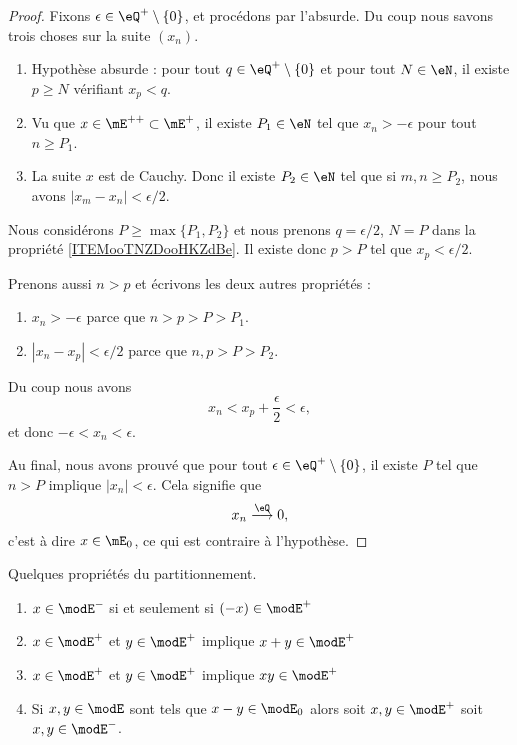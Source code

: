 \begin{proof}
    Fixons \( \epsilon\in \eQ^+\setminus\{ 0 \}\), et procédons par l'absurde. Du coup nous savons trois choses sur la suite \( (x_n)\).
    \begin{enumerate}
        \item       \label{ITEMooTNZDooHKZdBe}
            Hypothèse absurde : pour tout \( q\in \eQ^+\setminus\{ 0 \}\) et pour tout \( N\in \eN\), il existe \( p\geq N\) vérifiant \( x_p<q\).
        \item
            Vu que \( x\in \mE^{++}\subset \mE^+\), il existe \( P_1\in \eN\) tel que \( x_n>-\epsilon\) pour tout \( n\geq P_1\).
        \item
            La suite \( x\) est de Cauchy. Donc il existe \( P_2\in \eN\) tel que si \( m,n\geq P_2\), nous avons \( | x_m-x_n |<\epsilon/2\).
    \end{enumerate}
    Nous considérons \( P\geq \max\{ P_1, P_2 \}\) et nous prenons \( q=\epsilon/2\), \( N=P\) dans la propriété \ref{ITEMooTNZDooHKZdBe}. Il existe donc \( p>P\) tel que \( x_p<\epsilon/2\).

    Prenons aussi \( n>p\) et écrivons les deux autres propriétés :
    \begin{enumerate}
        \item \( x_n>-\epsilon\) parce que \( n>p>P>P_1\).
        \item \( | x_n-x_p |<\epsilon/2\) parce que \( n,p>P>P_2\).
    \end{enumerate}
    Du coup nous avons
    \begin{equation}
        x_n<x_p+\frac{ \epsilon }{2}<\epsilon,
    \end{equation}
    et donc \( -\epsilon<x_n<\epsilon\).

    Au final, nous avons prouvé que pour tout \( \epsilon\in \eQ^+\setminus\{ 0 \}\), il existe \( P\) tel que \( n>P\) implique \( | x_n |<\epsilon\). Cela signifie que
    \begin{equation}
        x_n\stackrel{\eQ}{\longrightarrow}0,
    \end{equation}
    c'est à dire \( x\in \mE_0\), ce qui est contraire à l'hypothèse.
\end{proof}


\begin{lemma}      \label{LEMooRKSXooFsIohe}
    Quelques propriétés du partitionnement.
    \begin{enumerate}
        \item       \label{ITEMooRQVKooCnwWOY}
            \( x\in\modE^-\) si et seulement si \( (-x)\in\modE^+\)
        \item       \label{ITEMooJUPOooOBubqA}
            \( x\in\modE^+\) et \( y\in\modE^+\) implique \( x+y\in\modE^+\)
        \item       \label{ITEMooDQLJooPViuVC}
            \( x\in\modE^+\) et \( y\in\modE^+\) implique \( xy\in\modE^+\)
        \item
            Si \( x,y\in\modE\) sont tels que \( x-y\in\modE_0\) alors soit \( x,y\in\modE^+\) soit \( x,y\in\modE^-\).
    \end{enumerate}
\end{lemma}

